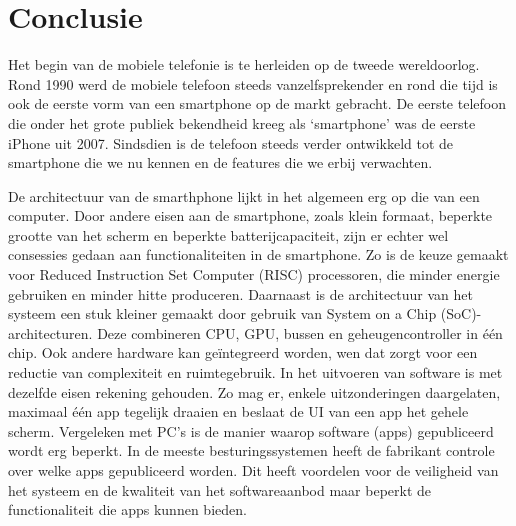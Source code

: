 ﻿\chapter{Conclusie}

Het begin van de mobiele telefonie is te herleiden op de tweede wereldoorlog.
Rond 1990 werd de mobiele telefoon steeds vanzelfsprekender en rond die tijd is ook de eerste vorm van een smartphone op de markt gebracht.
De eerste telefoon die onder het grote publiek bekendheid kreeg als `smartphone' was de eerste iPhone uit 2007.
Sindsdien is de telefoon steeds verder ontwikkeld tot de smartphone die we nu kennen en de features die we erbij verwachten.

De architectuur van de smarthphone lijkt in het algemeen erg op die van een computer.
Door andere eisen aan de smartphone, zoals klein formaat, beperkte grootte van het scherm en beperkte batterijcapaciteit, zijn er echter wel consessies gedaan aan functionaliteiten in de smartphone.
Zo is de keuze gemaakt voor Reduced Instruction Set Computer (RISC) processoren, die minder energie gebruiken en minder hitte produceren.
Daarnaast is de architectuur van het systeem een stuk kleiner gemaakt door gebruik van System on a Chip (SoC)-architecturen.
Deze combineren CPU, GPU, bussen en geheugencontroller in \'e\'en chip.
Ook andere hardware kan ge\"integreerd worden, wen dat zorgt voor een reductie van complexiteit en ruimtegebruik.
In het uitvoeren van software is met dezelfde eisen rekening gehouden.
Zo mag er, enkele uitzonderingen daargelaten, maximaal \'e\'en app tegelijk draaien en beslaat de UI van een app het gehele scherm.
Vergeleken met PC's is de manier waarop software (apps) gepubliceerd wordt erg beperkt.
In de meeste besturingssystemen heeft de fabrikant controle over welke apps gepubliceerd worden.
Dit heeft voordelen voor de veiligheid van het systeem en de kwaliteit van het softwareaanbod maar beperkt de functionaliteit die apps kunnen bieden.

